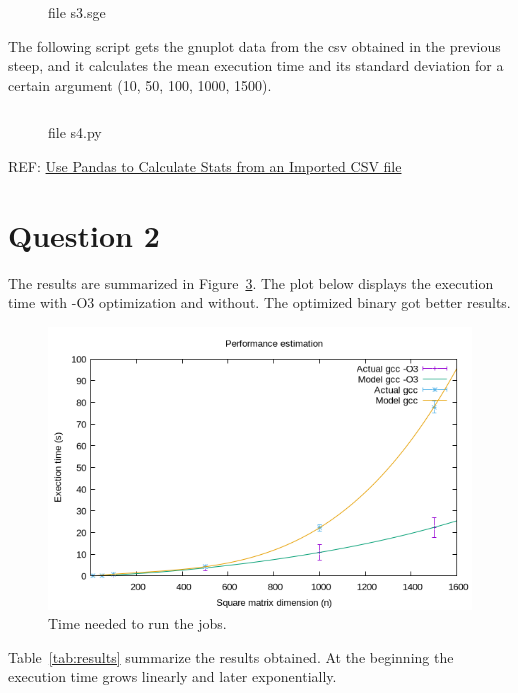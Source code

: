 \documentclass[12pt]{article}
\begin{document}
\begin{figure}[h!]
	\inputminted{shell}{s3.sge}
	\caption{file s3.sge}\label{code:endscript}
\end{figure}

\newpage

The following script gets the gnuplot data from the csv obtained in the previous steep, and it calculates the mean execution time and its standard deviation for a certain argument (10, 50, 100, 1000, 1500). 

\begin{figure}[h!]
\inputminted{python}{s4.py}
\caption{file s4.py}\label{code:python3}
\end{figure}

REF: \href{https://www.geeksforgeeks.org/use-pandas-to-calculate-stats-from-an-imported-csv-file/}{Use Pandas to Calculate Stats from an Imported CSV file}

\newpage

\section*{Question 2}

The results are summarized in Figure~\ref{fig:exectime}. The plot below displays the execution time with -O3 optimization and without. The optimized binary got better results.

\begin{figure}[h!]
	\centering
	\includegraphics[width=0.9\linewidth]{q2.png}
	\caption{Time needed to run the jobs.}
	\label{fig:exectime}
\end{figure}

Table~\ref{tab:results} summarize the results obtained. At the beginning the execution time grows linearly and later exponentially.
\end{document}
